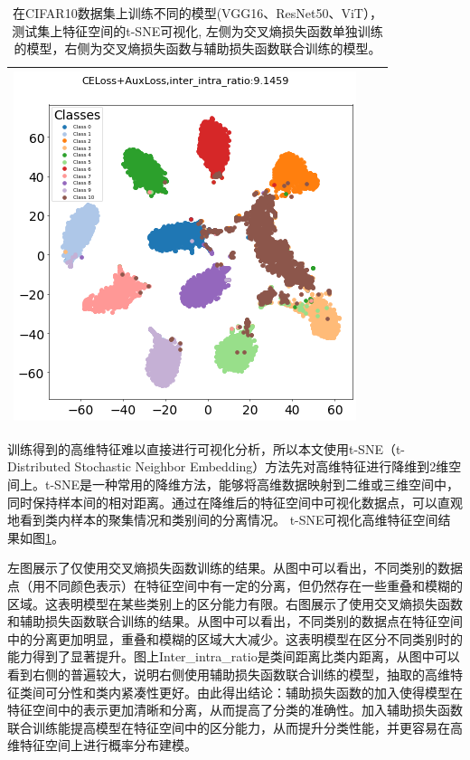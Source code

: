 \begin{table}[H]
\begin{tabular}{|c|c|c|}
\begin{minipage}{0.45\textwidth} \centering \includegraphics[width=\textwidth]{assets/vit_tsne_feature_c.png} \end{minipage} \\ \hline
\end{tabular}
\caption{在CIFAR10数据集上训练不同的模型(VGG16、ResNet50、ViT），测试集上特征空间的t-SNE可视化, 左侧为交叉熵损失函数单独训练的模型，右侧为交叉熵损失函数与辅助损失函数联合训练的模型。}
\label{cifar10-tsne}
\end{table}

训练得到的高维特征难以直接进行可视化分析，所以本文使用t-SNE（t-Distributed Stochastic Neighbor Embedding）\cite{van2008visualizing}方法先对高维特征进行降维到2维空间上。t-SNE是一种常用的降维方法，能够将高维数据映射到二维或三维空间中，同时保持样本间的相对距离。通过在降维后的特征空间中可视化数据点，可以直观地看到类内样本的聚集情况和类别间的分离情况。
t-SNE可视化高维特征空间结果如图\ref{cifar10-tsne}。


左图展示了仅使用交叉熵损失函数训练的结果。从图中可以看出，不同类别的数据点（用不同颜色表示）在特征空间中有一定的分离，但仍然存在一些重叠和模糊的区域。这表明模型在某些类别上的区分能力有限。右图展示了使用交叉熵损失函数和辅助损失函数联合训练的结果。从图中可以看出，不同类别的数据点在特征空间中的分离更加明显，重叠和模糊的区域大大减少。这表明模型在区分不同类别时的能力得到了显著提升。图上Inter\_intra\_ratio是类间距离比类内距离，从图中可以看到右侧的普遍较大，说明右侧使用辅助损失函数联合训练的模型，抽取的高维特征类间可分性和类内紧凑性更好。由此得出结论：辅助损失函数的加入使得模型在特征空间中的表示更加清晰和分离，从而提高了分类的准确性。加入辅助损失函数联合训练能提高模型在特征空间中的区分能力，从而提升分类性能，并更容易在高维特征空间上进行概率分布建模。


